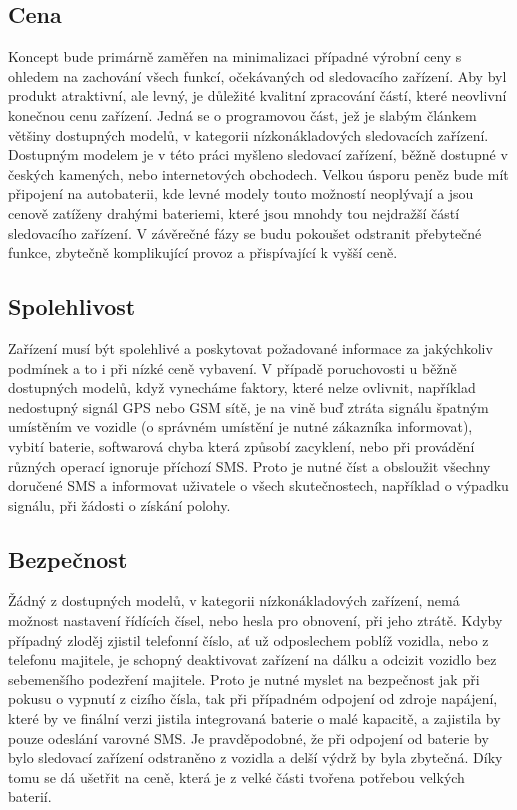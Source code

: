 \documentclass[FM,BP]{tulthesis}  %
\begin{document}
\subsection{Cena}
Koncept bude primárně zaměřen na minimalizaci případné výrobní ceny s ohledem na zachování všech funkcí, očekávaných od sledovacího zařízení. Aby byl produkt atraktivní, ale levný, je důležité kvalitní zpracování částí, které neovlivní konečnou cenu zařízení. Jedná se o programovou část, jež je slabým článkem většiny dostupných modelů, v kategorii nízkonákladových sledovacích zařízení. Dostupným modelem je v této práci myšleno sledovací zařízení, běžně dostupné v českých kamených, nebo internetových obchodech. Velkou úsporu peněz bude mít připojení na autobaterii, kde levné modely touto možností neoplývají a jsou cenově zatíženy drahými bateriemi, které jsou mnohdy tou nejdražší částí sledovacího zařízení. V závěrečné fázy se budu pokoušet odstranit přebytečné funkce, zbytečně komplikující provoz a přispívající k vyšší ceně.

\subsection{Spolehlivost}
Zařízení musí být spolehlivé a poskytovat požadované informace za jakýchkoliv podmínek a to i při nízké ceně vybavení. V případě poruchovosti u běžně dostupných modelů, když vynecháme faktory, které nelze ovlivnit, například nedostupný signál GPS nebo GSM sítě, je na vině buď ztráta signálu špatným umístěním ve vozidle (o správném umístění je nutné zákazníka informovat), vybití baterie, softwarová chyba která způsobí zacyklení, nebo při provádění různých operací ignoruje příchozí SMS. Proto je nutné číst a obsloužit všechny doručené SMS a informovat uživatele o všech skutečnostech, například o výpadku signálu, při žádosti o získání polohy.

\subsection{Bezpečnost}
Žádný z dostupných modelů, v kategorii nízkonákladových zařízení, nemá možnost nastavení řídících čísel, nebo hesla pro obnovení, při jeho ztrátě. Kdyby případný zloděj zjistil telefonní číslo, ať už odposlechem poblíž vozidla, nebo z telefonu majitele, je schopný deaktivovat zařízení na dálku a odcizit vozidlo bez sebemenšího podezření majitele. Proto je nutné myslet na bezpečnost jak při pokusu o vypnutí z cizího čísla, tak při případném odpojení od zdroje napájení, které by ve finální verzi jistila integrovaná baterie o malé kapacitě, a zajistila by pouze odeslání varovné SMS. Je pravděpodobné, že při odpojení od baterie by bylo sledovací zařízení odstraněno z vozidla a delší výdrž by byla zbytečná. Díky tomu se dá ušetřit na ceně, která je z velké části tvořena potřebou velkých baterií.
\end{document}
